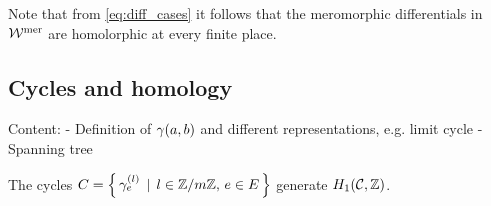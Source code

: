 \documentclass[main.tex]{subfiles}
\begin{document}
     \begin{rmk}
      Note that from \eqref{eq:diff_cases} it follows that the meromorphic differentials in $\mathcal{W}^{\text{mer}}$ are homolorphic at every finite place. 
     \end{rmk}
  
  \subsection{Cycles and homology}
    Content: - Definition of $\gamma(a,b)$ and different representations, e.g. limit cycle
	     - Spanning tree
  
  \newpage
  
  \begin{thm}\label{thm:gen_set}
   The cycles $C = \left\{ \, \gamma_{e}^{(l)} \, \mid \, l \in \mathbb{Z}/m\mathbb{Z}, \, e \in E \, \right\}$ generate $H_1(\mathcal{C},\mathbb{Z})$.
  \end{thm}
\end{document}
